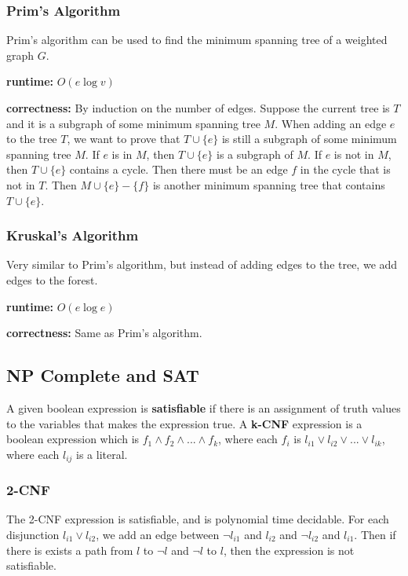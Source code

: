 \documentclass[a4paper,12pt]{article}
\begin{document}
\subsubsection{Prim's Algorithm}

Prim's algorithm can be used to find the minimum spanning tree of a weighted graph $G$.

\textbf{runtime:} $O(e \log v)$

\textbf{correctness:}
By induction on the number of edges.
Suppose the current tree is $T$ and it is a subgraph of some minimum spanning tree $M$.
When adding an edge $e$ to the tree $T$, we want to prove that $T \cup \{e\}$ is still a subgraph of some minimum spanning tree $M$.
If $e$ is in $M$, then $T \cup \{e\}$ is a subgraph of $M$.
If $e$ is not in $M$, then $T \cup \{e\}$ contains a cycle.
Then there must be an edge $f$ in the cycle that is not in $T$.
Then $M \cup \{e\} - \{f\}$ is another minimum spanning tree that contains $T \cup \{e\}$.

\subsubsection{Kruskal's Algorithm}

Very similar to Prim's algorithm, but instead of adding edges to the tree, we add edges to the forest.

\textbf{runtime:} $O(e \log e)$

\textbf{correctness:}
Same as Prim's algorithm.

\subsection{NP Complete and SAT}

A given boolean expression is \textbf{satisfiable} if there is an assignment of truth values to the variables that makes the expression true.
A \textbf{k-CNF} expression is a boolean expression which is $f_1 \land f_2 \land ... \land f_k$, where each $f_i$ is $l_{i1} \lor l_{i2} \lor ... \lor l_{ik}$, where each $l_{ij}$ is a literal.

\subsubsection{2-CNF}

The 2-CNF expression is satisfiable, and is polynomial time decidable.
For each disjunction $l_{i1} \lor l_{i2}$, we add an edge between $\neg l_{i1}$ and $l_{i2}$ and $\neg l_{i2}$ and $l_{i1}$.
Then if there is exists a path from $l$ to $\neg l$ and $\neg l$ to $l$, then the expression is not satisfiable.
\end{document}
